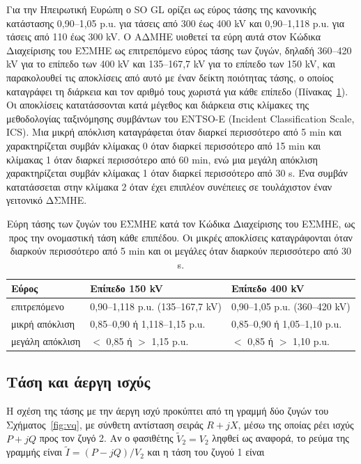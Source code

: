 Για την Ηπειρωτική Ευρώπη ο SO GL ορίζει ως εύρος τάσης της κανονικής κατάστασης
0,90--1,05 p.u. για τάσεις από 300 έως 400 kV και 0,90--1,118 p.u. για τάσεις από 110 έως
300 kV. Ο ΑΔΜΗΕ υιοθετεί τα εύρη αυτά στον Κώδικα Διαχείρισης του ΕΣΜΗΕ ως επιτρεπόμενο εύρος
τάσης των ζυγών, δηλαδή 360--420 kV για το επίπεδο των 400 kV και 135--167,7 kV για το
επίπεδο των 150 kV, και παρακολουθεί τις αποκλίσεις από αυτό με έναν δείκτη ποιότητας τάσης,
ο οποίος καταγράφει τη διάρκεια και τον αριθμό τους χωριστά για κάθε επίπεδο
(Πίνακας~\ref{tab:v-limits}). Οι αποκλίσεις κατατάσσονται κατά μέγεθος και διάρκεια στις
κλίμακες της μεθοδολογίας ταξινόμησης συμβάντων του ENTSO-E (Incident Classification Scale,
ICS). Μια μικρή απόκλιση καταγράφεται όταν διαρκεί περισσότερο από 5 min και χαρακτηρίζεται
συμβάν κλίμακας 0 όταν διαρκεί περισσότερο από 15 min και κλίμακας 1 όταν διαρκεί περισσότερο
από 60 min, ενώ μια μεγάλη απόκλιση χαρακτηρίζεται συμβάν κλίμακας 1 όταν διαρκεί περισσότερο
από 30 s. Ένα συμβάν κατατάσσεται στην κλίμακα 2 όταν έχει επιπλέον συνέπειες σε τουλάχιστον
έναν γειτονικό ΔΣΜΗΕ.

\begin{table}[!htbp]
\centering
\begin{tabular}{lll}
\hline
Εύρος & Επίπεδο 150 kV & Επίπεδο 400 kV \\
\hline
επιτρεπόμενο & 0,90--1,118 p.u. (135--167,7 kV) & 0,90--1,05 p.u. (360--420 kV) \\
μικρή απόκλιση & 0,85--0,90 ή 1,118--1,15 p.u. & 0,85--0,90 ή 1,05--1,10 p.u. \\
μεγάλη απόκλιση & $<$ 0,85 ή $>$ 1,15 p.u. & $<$ 0,85 ή $>$ 1,10 p.u. \\
\hline
\end{tabular}
\caption{Εύρη τάσης των ζυγών του ΕΣΜΗΕ κατά τον Κώδικα Διαχείρισης του ΕΣΜΗΕ, ως προς την
ονομαστική τάση κάθε επιπέδου. Οι μικρές αποκλίσεις καταγράφονται όταν διαρκούν περισσότερο
από 5 min και οι μεγάλες όταν διαρκούν περισσότερο από 30 s.}
\label{tab:v-limits}
\end{table}

\subsection{Τάση και άεργη ισχύς}
\label{sec:v-q}

Η σχέση της τάσης με την άεργη ισχύ προκύπτει από τη γραμμή δύο ζυγών του
Σχήματος~\ref{fig:vq}, με σύνθετη αντίσταση σειράς $R + jX$, μέσω της οποίας ρέει ισχύς
$P + jQ$ προς τον ζυγό 2. Αν ο φασιθέτης $\tilde{V}_2 = V_2$ ληφθεί ως αναφορά, το ρεύμα της
γραμμής είναι $\tilde{I} = (P - jQ)/V_2$ και η τάση του ζυγού 1 είναι

